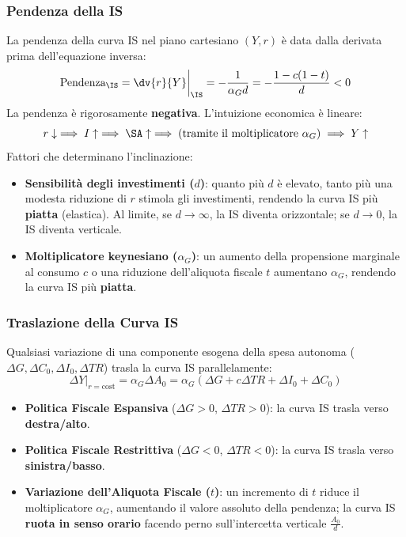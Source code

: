 \subsubsection{Pendenza della IS}
La pendenza della curva IS nel piano cartesiano $(Y, r)$ è data dalla derivata prima dell'equazione inversa:
\begin{equation}
    \text{Pendenza}_{\IS} = \dv{r}{Y}\bigg|_{\IS} = -\frac{1}{\alpha_G d} = -\frac{1 - c(1-t)}{d} < 0
\end{equation}
La pendenza è rigorosamente \textbf{negativa}. L'intuizione economica è lineare:
\begin{equation}
    r \downarrow \implies I \uparrow \implies \SA \uparrow \implies (\text{tramite il moltiplicatore } \alpha_G) \implies Y \uparrow
\end{equation}
Fattori che determinano l'inclinazione:
\begin{itemize}
    \item \textbf{Sensibilità degli investimenti ($d$)}: quanto più $d$ è elevato, tanto più una modesta riduzione di $r$ stimola gli investimenti, rendendo la curva IS più \textbf{piatta} (elastica). Al limite, se $d \to \infty$, la IS diventa orizzontale; se $d \to 0$, la IS diventa verticale.
    \item \textbf{Moltiplicatore keynesiano ($\alpha_G$)}: un aumento della propensione marginale al consumo $c$ o una riduzione dell'aliquota fiscale $t$ aumentano $\alpha_G$, rendendo la curva IS più \textbf{piatta}.
\end{itemize}

\subsubsection{Traslazione della Curva IS}
Qualsiasi variazione di una componente esogena della spesa autonoma ($\Delta G, \Delta C_0, \Delta I_0, \Delta TR$) trasla la curva IS parallelamente:
\begin{equation}
    \Delta Y\big|_{r=\text{cost}} = \alpha_G \Delta A_0 = \alpha_G (\Delta G + c \Delta TR + \Delta I_0 + \Delta C_0)
\end{equation}
\begin{itemize}
    \item \textbf{Politica Fiscale Espansiva} ($\Delta G > 0$, $\Delta TR > 0$): la curva IS trasla verso \textbf{destra/alto}.
    \item \textbf{Politica Fiscale Restrittiva} ($\Delta G < 0$, $\Delta TR < 0$): la curva IS trasla verso \textbf{sinistra/basso}.
    \item \textbf{Variazione dell'Aliquota Fiscale ($t$)}: un incremento di $t$ riduce il moltiplicatore $\alpha_G$, aumentando il valore assoluto della pendenza; la curva IS \textbf{ruota in senso orario} facendo perno sull'intercetta verticale $\frac{A_0}{d}$.
\end{itemize}

